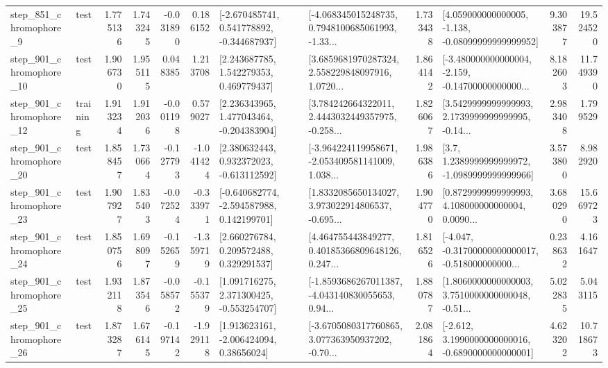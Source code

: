\begin{tabular}{llrrrrllrlrr}
   step\_851\_chromophore\_9 &      test &      1.775136 &    1.743245 &     -0.031890 &  0.186152 &   [-2.670485741, 0.541778892, -0.344687937] &  [-4.068345015248735, 0.7948100685061993, -1.33... &       1.733438 &  [4.059000000000005, -1.138, -0.08099999999999952] &            9.303877 &         19.524520 \\
  step\_901\_chromophore\_10 &      test &      1.906730 &    1.955115 &      0.048385 &  1.213708 &     [2.243687785, 1.542279353, 0.469779437] &  [3.6859681970287324, 2.558229848097916, 1.0720... &       1.864142 &  [-3.480000000000004, -2.159, -0.14700000000000... &            8.182603 &         11.749390 \\
  step\_901\_chromophore\_12 &  training &      1.913234 &    1.912036 &     -0.001198 &  0.579027 &    [2.236343965, 1.477043464, -0.204383904] &  [3.784242664322011, 2.4443032449357975, -0.258... &       1.826067 &  [3.5429999999999993, 2.1739999999999995, -0.14... &            2.983408 &          1.799529 \\
  step\_901\_chromophore\_20 &      test &      1.858457 &    1.730664 &     -0.127793 & -1.041424 &    [2.380632443, 0.932372023, -0.613112592] &  [-3.964224119958671, -2.053409581141009, 1.038... &       1.986386 &     [3.7, 1.2389999999999972, -1.0989999999999966] &            3.573800 &          8.982920 \\
  step\_901\_chromophore\_23 &      test &      1.907927 &    1.835403 &     -0.072524 & -0.333971 &   [-0.640682774, -2.594587988, 0.142199701] &  [1.8332085650134027, 3.973022914806537, -0.695... &       1.904770 &  [0.8729999999999993, 4.108000000000004, 0.0090... &            3.680290 &         15.669723 \\
  step\_901\_chromophore\_24 &      test &      1.850756 &    1.698097 &     -0.152659 & -1.359719 &     [2.660276784, 0.209572488, 0.329291537] &  [4.464755443849277, 0.40185366809648126, 0.247... &       1.816526 &  [-4.047, -0.31700000000000017, -0.518000000000... &            0.238632 &          4.161647 \\
  step\_901\_chromophore\_25 &      test &      1.932118 &    1.873546 &     -0.058572 & -0.155379 &    [1.091716275, 2.371300425, -0.553254707] &  [-1.8593686267011387, -4.043140830055653, 0.94... &       1.880787 &  [1.8060000000000003, 3.7510000000000048, -0.51... &            5.022835 &          5.043115 \\
  step\_901\_chromophore\_26 &      test &      1.873287 &    1.676145 &     -0.197142 & -1.929118 &     [1.913623161, -2.006424094, 0.38656024] &  [-3.6705080317760865, 3.077363950937202, -0.70... &       2.081864 &  [-2.612, 3.1990000000000016, -0.6890000000000001] &            4.623202 &         10.718673 \\

\end{tabular}
